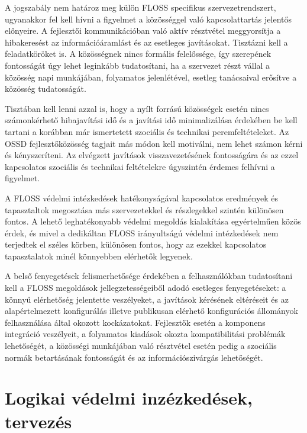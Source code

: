 \documentclass[12pt,magyar,a4paper,oneside]{scrreprt}
\begin{document}
A jogszabály nem határoz meg külön FLOSS specifikus szervezetrendszert,
ugyanakkor fel kell hívni a figyelmet a közösséggel való kapcsolattartás
jelentős előnyeire. A fejlesztői kommunikációban való aktív résztvétel
meggyorsítja a hibakeresést az információáramlást és az esetleges
javításokat. Tisztázni kell a feladatköröket is. A közösségnek nincs
formális felelőssége, így szerepének fontosságát úgy lehet leginkább
tudatosítani, ha a szervezet részt vállal a közösség napi munkájában,
folyamatos jelenlétével, esetleg tanácsaival erősítve a közösség
tudatosságát.

Tisztában kell lenni azzal is, hogy a nyílt forrású közösségek esetén
nincs számonkérhető hibajavítási idő és a javítási idő minimalizálása
érdekében be kell tartani a korábban már ismertetett szociális és
technikai peremfeltételeket. Az OSSD fejlesztőközösség tagjait más módon
kell motiválni, nem lehet számon kérni és kényszeríteni. Az elvégzett
javítások visszavezetésének fontosságára és az ezzel kapcsolatos
szociális és technikai feltételekre úgyszintén érdemes felhívni a
figyelmet.

A FLOSS védelmi intézkedések hatékonyságával kapcsolatos eredmények és
tapasztaltok megosztása más szervezetekkel és részlegekkel szintén
különösen fontos. A lehető leghatékonyabb védelmi megoldás kialakítása
egyértelműen közös érdek, és mivel a dedikáltan FLOSS irányultságú
védelmi intézkedések nem terjedtek el széles körben, különösen fontos,
hogy az ezekkel kapcsolatos tapasztalatok minél könnyebben elérhetők
legyenek.

A belső fenyegetések felismerhetősége érdekében a felhasználókban
tudatosítani kell a FLOSS megoldások jellegzetességeiből adodó esetleges
fenyegetéseket: a könnyű elérhetőség jelentette veszélyeket, a javítások
kérésének eltéréseit és az alapértelmezett konfigurálás illetve
publikusan elérhető konfigurációs állományok felhasználása által okozott
kockázatokat. Fejlesztők esetén a komponens integráció veszélyeit, a
folyamatos kiadások okozta kompatibilitási problémák lehetőségét, a
közösségi munkájában való résztvétel esetén pedig a szociális normák
betartásának fontosságát és az információszivárgás lehetőségét.

\hypertarget{logikai-vuxe9delmi-inzuxe9zkeduxe9sek-tervezuxe9s}{%
\section{Logikai védelmi inzézkedések,
tervezés}\label{logikai-vuxe9delmi-inzuxe9zkeduxe9sek-tervezuxe9s}}
\end{document}
